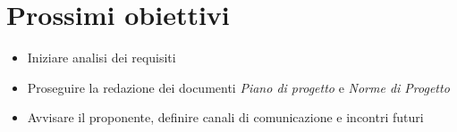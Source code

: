 \section{Prossimi obiettivi}
   \begin{itemize}
        \item Iniziare analisi dei requisiti
        \item Proseguire la redazione dei documenti \textit{Piano di progetto} e \textit{Norme di Progetto}
        \item Avvisare il proponente, definire canali di comunicazione e incontri futuri
    \end{itemize}